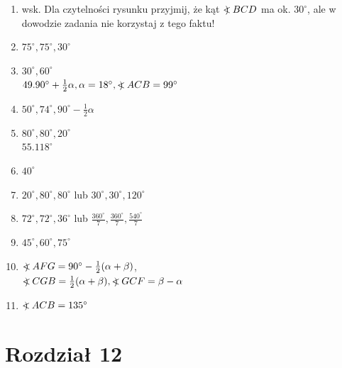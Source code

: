 \documentclass[10pt]{article}
\newcommand\Varangle{\mathop{{<\!\!\!\!\!\text{\small)}}\:}\nolimits}
\begin{document}
\begin{enumerate}
  \item wsk. Dla czytelności rysunku przyjmij, że kąt \(\Varangle B C D\) ma ok. \(30^{\circ}\), ale w dowodzie zadania nie korzystaj z tego faktu!
  \item \(75^{\circ}, 75^{\circ}, 30^{\circ}\)
  \item \(30^{\circ}, 60^{\circ}\)\\
\(49.90^{\circ}+\frac{1}{2} \alpha, \alpha=18^{\circ}, \Varangle A C B=99^{\circ}\)
  \item \(50^{\circ}, 74^{\circ}, 90^{\circ}-\frac{1}{2} \alpha\)
  \item \(80^{\circ}, 80^{\circ}, 20^{\circ}\)\\
\(55.118^{\circ}\)
  \item \(40^{\circ}\)
  \item \(20^{\circ}, 80^{\circ}, 80^{\circ}\) lub \(30^{\circ}, 30^{\circ}, 120^{\circ}\)
  \item \(72^{\circ}, 72^{\circ}, 36^{\circ}\) lub \(\frac{360^{\circ}}{7}, \frac{360^{\circ}}{7}, \frac{540^{\circ}}{7}\)
  \item \(45^{\circ}, 60^{\circ}, 75^{\circ}\)
  \item \(\Varangle A F G=90^{\circ}-\frac{1}{2}(\alpha+\beta)\),\\
\(\Varangle C G B=\frac{1}{2}(\alpha+\beta), \Varangle G C F=\beta-\alpha\)
  \item \(\Varangle A C B=135^{\circ}\)
\end{enumerate}

\section*{Rozdział 12}
\end{document}
